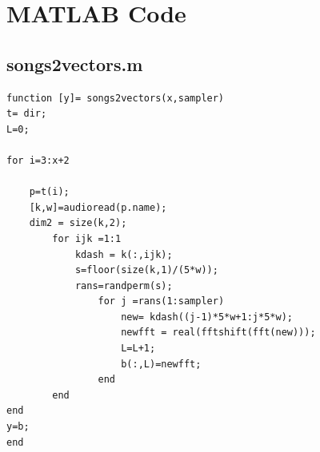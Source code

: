\documentclass[a4paper]{article}
\begin{document}
\section{MATLAB Code}
\subsection{songs2vectors.m}
\begin{lstlisting}[style=myMatlabstyle]
function [y]= songs2vectors(x,sampler)
t= dir;
L=0;

for i=3:x+2

	p=t(i);
	[k,w]=audioread(p.name);
	dim2 = size(k,2);
		for ijk =1:1
			kdash = k(:,ijk);   
			s=floor(size(k,1)/(5*w));
			rans=randperm(s);
				for j =rans(1:sampler)
					new= kdash((j-1)*5*w+1:j*5*w);
					newfft = real(fftshift(fft(new)));
					L=L+1;
					b(:,L)=newfft; 
				end
		end
end
y=b;
end
\end{lstlisting}
\end{document}
